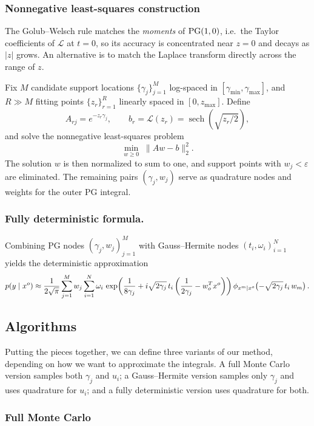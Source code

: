 \subsubsection{Nonnegative least-squares construction}
The Golub--Welsch rule matches the \emph{moments} of $\mathrm{PG}(1,0)$, i.e.\ the
Taylor coefficients of $\mathcal{L}$ at $t=0$, so its accuracy is concentrated
near $z=0$ and decays as $|z|$ grows. An alternative is to match the Laplace
transform directly across the range of $z$.

Fix $M$ candidate support locations $\{\gamma_j\}_{j=1}^M$ log-spaced in
$[\gamma_{\min}, \gamma_{\max}]$, and $R \gg M$ fitting points $\{z_r\}_{r=1}^R$
linearly spaced in $[0, z_{\max}]$. Define
\[
  A_{rj} = e^{-z_r \gamma_j}, \qquad
  b_r = \mathcal{L}(z_r) = \operatorname{sech}\!\left(\sqrt{z_r/2}\right),
\]
and solve the nonnegative least-squares problem
\[
  \min_{w \ge 0} \; \|A w - b\|_2^2.
\]
The solution $w$ is then normalized to sum to one, and support points with
$w_j < \varepsilon$ are eliminated. The remaining pairs $(\gamma_j, w_j)$ serve
as quadrature nodes and weights for the outer PG integral.

\subsubsection{Fully deterministic formula.}
Combining PG nodes $(\gamma_j, w_j)_{j=1}^{M}$ with Gauss--Hermite
nodes $(t_i, \omega_i)_{i=1}^{N}$ yields the deterministic approximation
\[
  p(y \mid x^o) \approx
  \frac{1}{2\sqrt{\pi}} \sum_{j=1}^{M} w_j \sum_{i=1}^{N} \omega_i \,
  \exp\!\left(\frac{1}{8\gamma_j} + i\sqrt{2\gamma_j}\,t_i
    \left(\frac{1}{2\gamma_j} - w_o^T x^o\right)\right)
  \phi_{x^m \mid x^o}\!\left(-\sqrt{2\gamma_j}\,t_i\,w_m\right).
\]

\subsection{Algorithms}

Putting the pieces together, we can define three variants of our method, depending on how we want to 
approximate the integrals. A full Monte Carlo version samples both $\gamma_j$ and $u_i$; 
a Gauss--Hermite version samples only $\gamma_j$ and uses quadrature for $u_i$; 
and a fully deterministic version uses quadrature for both.

\subsubsection{Full Monte Carlo}

